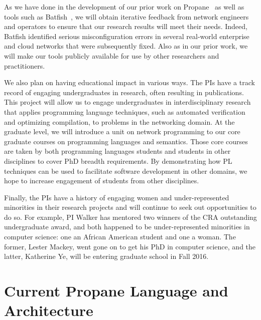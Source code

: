 As we have done in the development of our prior work on Propane~\cite{beckett+:propane} as well as tools such as Batfish~\cite{batfish}, we will obtain iterative feedback from network engineers and operators to ensure that our research results will meet their needs.  Indeed, Batfish identified serious misconfiguration errors in several real-world enterprise and cloud networks that were subsequently fixed.  Also as in our prior work, we will make our tools publicly available for use by other researchers and practitioners.

We also plan on having educational impact in various ways.  
The PIs have a track record of engaging undergraduates in research, often resulting in publications.  This project will allow us to engage undergraduates in interdisciplinary
research that applies programming language techniques, such as
automated verification and optimizing compilation, to problems in the networking domain.  At the graduate
level, we will introduce a unit on network programming to our core
graduate courses on programming languages and semantics.  Those core
courses are taken by both programming languages students and students
in other disciplines to cover PhD breadth requirements.  By
demonstrating how PL techniques can be used to facilitate software
development in other domains, we hope to increase engagement of
students from other disciplines.

Finally, the PIs have a history of engaging women and under-represented minorities in
their research projects and will continue to seek out opportunities to
do so.  For example, PI Walker has mentored two winners of the CRA
outstanding undergraduate award, and both happened to be
under-represented minorities in computer science: one an African
American student and one a woman.  The former, Lester Mackey, went
gone on to get his PhD in computer science, and the latter, Katherine
Ye, will be entering graduate school in Fall 2016.  


\section{Current Propane Language and Architecture}
\label{sec:propane}

